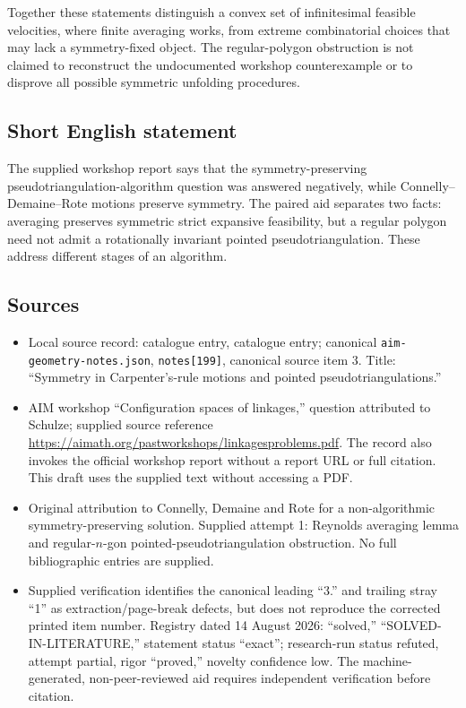 \documentclass[11pt]{article}
\begin{document}
Together these statements distinguish a convex set of infinitesimal feasible velocities, where finite averaging works, from extreme combinatorial choices that may lack a symmetry-fixed object. The regular-polygon obstruction is not claimed to reconstruct the undocumented workshop counterexample or to disprove all possible symmetric unfolding procedures.
\subsection{Short English statement}
The supplied workshop report says that the symmetry-preserving pseudotriangulation-algorithm question was answered negatively, while Connelly--Demaine--Rote motions preserve symmetry. The paired aid separates two facts: averaging preserves symmetric strict expansive feasibility, but a regular polygon need not admit a rotationally invariant pointed pseudotriangulation. These address different stages of an algorithm.
\subsection{Sources}
\begin{itemize}
\item Local source record: catalogue entry, catalogue entry; canonical \texttt{aim-geometry-notes.json}, \texttt{notes[199]}, canonical source item 3. Title: ``Symmetry in Carpenter's-rule motions and pointed pseudotriangulations.''
\item AIM workshop ``Configuration spaces of linkages,'' question attributed to Schulze; supplied source reference \url{https://aimath.org/pastworkshops/linkagesproblems.pdf}. The record also invokes the official workshop report without a report URL or full citation. This draft uses the supplied text without accessing a PDF.
\item Original attribution to Connelly, Demaine and Rote for a non-algorithmic symmetry-preserving solution. Supplied attempt 1: Reynolds averaging lemma and regular-\(n\)-gon pointed-pseudotriangulation obstruction. No full bibliographic entries are supplied.
\item Supplied verification identifies the canonical leading ``3.'' and trailing stray ``1'' as extraction/page-break defects, but does not reproduce the corrected printed item number. Registry dated 14 August 2026: ``solved,'' ``SOLVED-IN-LITERATURE,'' statement status ``exact''; research-run status refuted, attempt partial, rigor ``proved,'' novelty confidence low. The machine-generated, non-peer-reviewed aid requires independent verification before citation.
\end{itemize}
\end{document}
